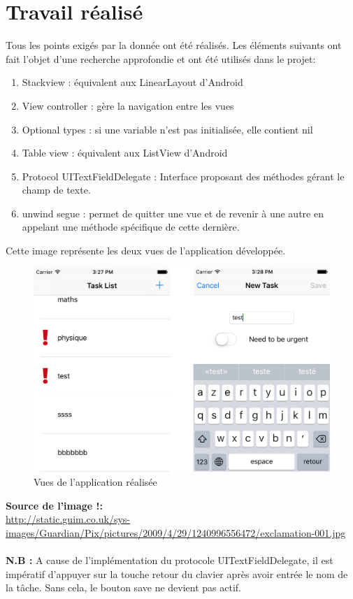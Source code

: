 \section{Travail réalisé}
Tous les points exigés par la donnée ont été réalisés. Les éléments suivants ont fait l'objet d'une recherche approfondie et ont été utilisés dans le projet:
\begin{enumerate}
	\item Stackview : équivalent aux LinearLayout d'Android
	\item View controller : gère la navigation entre les vues
	\item Optional types : si une variable n'est pas initialisée, elle contient nil
	\item Table view : équivalent aux ListView d'Android
	\item Protocol UITextFieldDelegate : Interface proposant des méthodes gérant le champ de texte.
	\item unwind segue : permet de quitter une vue et de revenir à une autre en appelant une méthode spécifique de cette dernière.\\
\end{enumerate}
Cette image représente les deux vues de l'application développée.
\begin{figure}[H]
	\begin{center}
		\includegraphics[width=14cm]{img/simulator.png}
		\caption{Vues de l'application réalisée}
		\label{vues}
	\end{center}
\end{figure}
\textbf{Source de l'image !:\\}
\url{http://static.guim.co.uk/sys-images/Guardian/Pix/pictures/2009/4/29/1240996556472/exclamation-001.jpg}\\\\
\textbf{N.B :} A cause de l'implémentation du protocole UITextFieldDelegate, il est impératif d'appuyer sur la touche retour du clavier après avoir entrée le nom de la tâche. Sans cela, le bouton save ne devient pas actif.